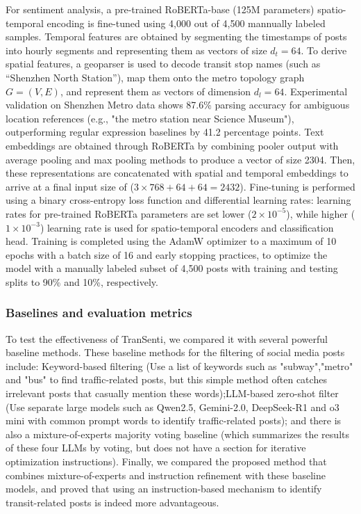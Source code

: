 \documentclass[a4paper,fleqn,12pt]{cas-sc}
\begin{document}
For sentiment analysis, a pre-trained RoBERTa-base (125M parameters) spatio-temporal encoding is fine-tuned using 4,000 out of 4,500 mannually labeled samples. Temporal features are obtained by segmenting the timestamps of posts into hourly segments and representing them as vectors of size \(d_t=64\). To derive spatial features, a geoparser is used to decode transit stop names (such as “Shenzhen North Station”), map them onto the metro topology graph \(G=(V,E)\), and represent them as vectors of dimension \(d_l=64\). Experimental validation on Shenzhen Metro data shows 87.6\% parsing accuracy for ambiguous location references (e.g., "the metro station near Science Museum"), outperforming regular expression baselines by 41.2 percentage points. Text embeddings are obtained through RoBERTa by combining pooler output with average pooling and max pooling methods to produce a vector of size 2304. Then, these representations are concatenated with spatial and temporal embeddings to arrive at a final input size of (\(3\times768+64+64=2432\)). Fine-tuning is performed using a binary cross-entropy loss function and differential learning rates: learning rates for pre-trained RoBERTa parameters are set lower (\(2\times10^{-5}\)), while higher (\(1\times10^{-3}\)) learning rate is used for spatio-temporal encoders and classification head. Training is completed using the AdamW optimizer to a maximum of 10 epochs with a batch size of 16 and early stopping practices, to optimize the model with a manually labeled subset of 4,500 posts with training and testing splits to 90\% and 10\%, respectively. 

\subsubsection{Baselines and evaluation metrics} 
To test the effectiveness of TranSenti, we compared it with several powerful baseline methods. These baseline methods for the filtering of social media posts include: Keyword-based filtering (Use a list of keywords such as "subway","metro" and "bus" to find traffic-related posts, but this simple method often catches irrelevant posts that casually mention these words);LLM-based zero-shot filter (Use separate large models such as Qwen2.5, Gemini-2.0, DeepSeek-R1 and o3 mini with common prompt words to identify traffic-related posts); and there is also a mixture-of-experts majority voting baseline (which summarizes the results of these four LLMs by voting, but does not have a section for iterative optimization instructions). Finally, we compared the proposed method that combines mixture-of-experts and instruction refinement with these baseline models, and proved that using an instruction-based mechanism to identify transit-related posts is indeed more advantageous.
\end{document}
